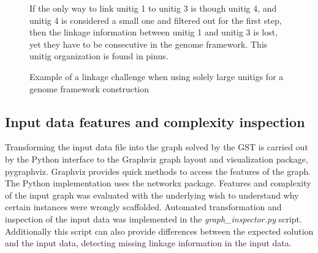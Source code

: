 \documentclass[12pt]{article}
\begin{document}
\begin{figure}[h!]
\begin{center}
\end{center}
\caption{Example of a linkage challenge when using solely large unitigs for a genome framework construction}
{\footnotesize If the only way to link unitig 1 to unitig 3 is though unitig 4, and unitig 4 is considered a small one and filtered out for the first step, then the linkage information between unitig 1 and unitig 3 is lost, yet they have to be consecutive in the genome framework. This unitig organization is found in pinus.}
\label{fig:flowlinkage}
\end{figure}


\subsection{Input data features and complexity inspection}
Transforming the input data file into the graph solved by the GST is carried out by the Python interface to the Graphviz graph layout and visualization package, pygraphviz. Graphviz provides quick methods to access the features of the graph. The Python implementation uses the networkx package. Features and complexity of the input graph was evaluated with the underlying wish to understand why certain instances were wrongly scaffolded. Automated transformation and inspection of the input data was implemented in the \textit{graph\_inspector.py} script. Additionally this script can also provide differences between the expected solution and the input data, detecting missing linkage information in the input data.
\end{document}
